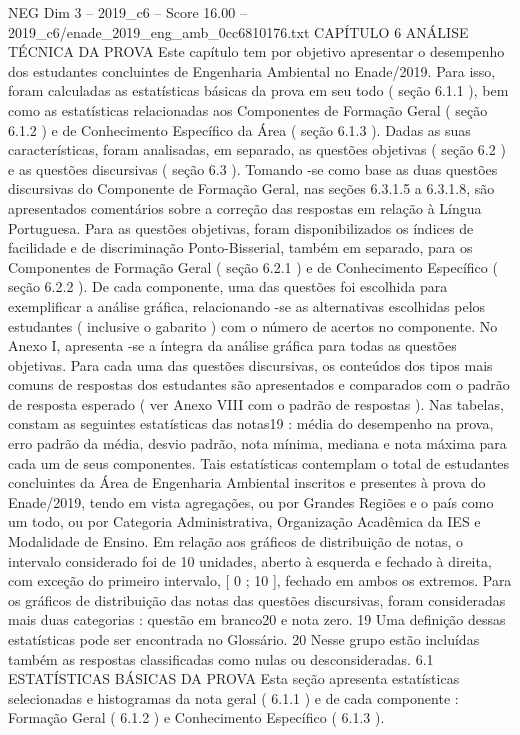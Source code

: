 \begin{textsample}{NEG Dim 3 – 2019\_c6 – Score 16.00 – 2019\_c6/enade\_2019\_eng\_amb\_0cc6810176.txt}  \label{ex:f3_neg_274}
CAPÍTULO 6 ANÁLISE TÉCNICA DA PROVA Este capítulo tem por objetivo apresentar o desempenho dos estudantes concluintes de Engenharia Ambiental no Enade/2019.
Para isso, foram calculadas as estatísticas básicas da prova em seu todo ( seção 6.1.1 ), bem como as estatísticas relacionadas aos Componentes de Formação Geral ( seção 6.1.2 ) e de Conhecimento Específico da Área ( seção 6.1.3 ).
Dadas as suas características, foram analisadas, em separado, as questões objetivas ( seção 6.2 ) e as questões discursivas ( seção 6.3 ).
Tomando -se como base as duas questões discursivas do Componente de Formação Geral, nas seções 6.3.1.5 a 6.3.1.8, são apresentados comentários sobre a correção das respostas em relação à Língua Portuguesa.
Para as questões objetivas, foram disponibilizados os índices de facilidade e de discriminação Ponto-Bisserial, também em separado, para os Componentes de Formação Geral ( seção 6.2.1 ) e de Conhecimento Específico ( seção 6.2.2 ).
De cada componente, uma das questões foi escolhida para exemplificar a análise gráfica, relacionando -se as alternativas escolhidas pelos estudantes ( inclusive o gabarito ) com o número de acertos no componente.
No Anexo I, apresenta -se a íntegra da análise gráfica para todas as questões objetivas.
Para cada uma das questões discursivas, os conteúdos dos tipos mais comuns de respostas dos estudantes são apresentados e comparados com o padrão de resposta esperado ( ver Anexo VIII com o padrão de respostas ).
Nas tabelas, constam as seguintes estatísticas das notas19 : média do desempenho na prova, erro padrão da média, desvio padrão, nota mínima, mediana e nota máxima para cada um de seus componentes.
Tais estatísticas contemplam o total de estudantes concluintes da Área de Engenharia Ambiental inscritos e presentes à prova do Enade/2019, tendo em vista agregações, ou por Grandes Regiões e o país como um todo, ou por Categoria Administrativa, Organização Acadêmica da IES e Modalidade de Ensino.
Em relação aos gráficos de distribuição de notas, o intervalo considerado foi de 10 unidades, aberto à esquerda e fechado à direita, com exceção do primeiro intervalo, [ 0 ; 10 ], fechado em ambos os extremos.
Para os gráficos de distribuição das notas das questões discursivas, foram consideradas mais duas categorias : questão em branco20 e nota zero. 19 Uma definição dessas estatísticas pode ser encontrada no Glossário. 20 Nesse grupo estão incluídas também as respostas classificadas como nulas ou desconsideradas. 6.1 ESTATÍSTICAS BÁSICAS DA PROVA Esta seção apresenta estatísticas selecionadas e histogramas da nota geral ( 6.1.1 ) e de cada componente : Formação Geral ( 6.1.2 ) e Conhecimento Específico ( 6.1.3 ).

\end{textsample}
